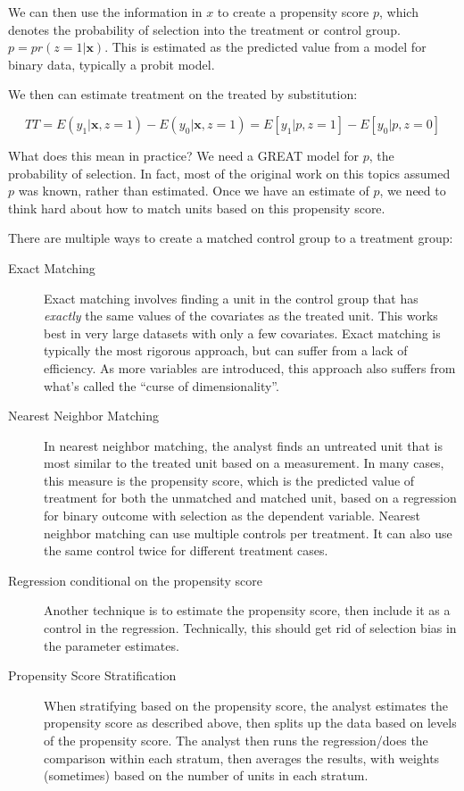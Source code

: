 \documentclass[12pt]{article}
\newcommand{\boldx}{\boldsymbol{x}}
\begin{document}
We can then use the information in $x$ to create a propensity score
$p$, which denotes the probability of selection into the treatment or
control group. $p=pr(z=1|\boldx)$. This is estimated as the predicted value
from a model for binary data, typically a probit model. 

We then can estimate treatment on the treated by substitution:

\begin{equation*}
TT=E(y_1|\boldx,z=1)-E(y_0|\boldx,z=1)=E[y_1|p,z=1]-E[y_0|p,z=0]
\end{equation*} 

What does this mean in practice? We need a GREAT model for $p$, the
probability of selection. In fact, most of the original work on this
topics assumed $p$ was known, rather than estimated. Once we have an
estimate of $p$, we need to think hard
about how to match units based on this propensity score. 

There are multiple ways to create a matched control group to a
treatment group:

\begin{description}
\item[Exact Matching] Exact matching involves finding a unit in the control group that has
  \emph{exactly} the same values of the covariates as the treated
  unit. This works best in very large datasets with only a few
  covariates. Exact matching is typically the most rigorous approach,
  but can suffer from a lack of efficiency. As more variables are
  introduced, this approach also suffers from what's called the
  ``curse of dimensionality''. 

\item[Nearest Neighbor Matching] In nearest neighbor matching, the
  analyst finds an untreated unit that is most similar to the treated
  unit based on a measurement. In many cases, this measure is the
  propensity score, which is the predicted value of treatment for both
  the unmatched and matched unit, based on a regression for binary outcome with
  selection as the dependent variable. Nearest neighbor matching can
  use multiple controls per treatment. It can also use the same
  control twice for different treatment cases.  

\item[Regression conditional on the propensity score] Another
  technique is to estimate the propensity score, then include it as a
  control in the regression. Technically, this should get rid of
  selection bias in the parameter estimates. 

\item[Propensity Score Stratification] When stratifying based on the
  propensity score, the analyst estimates the propensity score as
  described above, then splits up the data based on levels of the
  propensity score. The analyst then runs the regression/does the
  comparison within each stratum, then averages the results, with
  weights (sometimes) based on the number of units in each stratum. 

\end{description}
\end{document}
